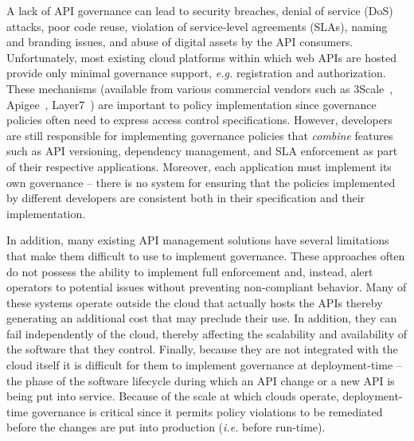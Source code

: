 A lack of API governance can lead to 
security breaches, denial of service (DoS)
attacks, poor code reuse, violation of service-level agreements (SLAs), 
naming and branding issues, and abuse of digital 
assets by the API consumers. Unfortunately, most existing cloud platforms
within which web APIs are hosted provide only minimal governance support, {\em
e.g.}
registration and authorization.  These mechanisms
(available from various commercial vendors such as
3Scale~\cite{3scale}, Apigee~\cite{apigee},
Layer7~\cite{layer7})
are important to policy implementation since governance policies often need to
express access control specifications.  
However, developers are still responsible for implementing governance policies
that {\em combine} features such as API versioning, 
dependency management, and SLA enforcement as part of their respective
applications.  Moreover, each application must
implement its own governance -- there is no system for ensuring that the
policies implemented by different developers are consistent both in their
specification and their implementation.

In addition, many existing
API management solutions have several limitations that make them difficult to
use to implement governance.  
These approaches often 
do not possess the ability to implement full enforcement and, instead, alert
operators to potential issues without preventing non-compliant behavior.
Many of these systems operate outside the 
cloud that actually hosts the APIs thereby generating an additional cost that
may preclude their use.
In addition, they can fail independently of the cloud, thereby affecting 
the scalability and availability of the software that they control.
Finally, because they are not integrated with the cloud itself it is difficult
for them to
implement governance at deployment-time -- the phase of the software lifecycle
during which an API change or a new API is being put into service.
Because of the scale at which clouds operate, deployment-time governance is
critical since it permits policy violations to be remediated before the
changes are put into production ({\em i.e.} before run-time).

